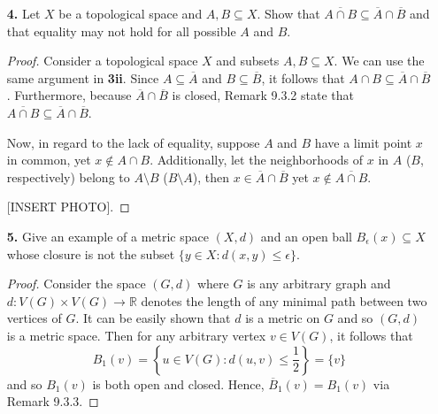 \documentclass[ 12pt ]{article}
\begin{document}
\begin{enumerate}
\begin{proof}
\begin{enumerate}
				\item[\textbf{ii.}] We know that $A \subseteq \overline{A}$ and $B \subseteq \overline{B}$ and so $A \cup B \subseteq \overline{A} \cup \overline{B}$ where $\overline{A}
					\cup \overline{B}$ is closed. Then by Remark 9.3.2, it holds that $\overline{A \cup B} \subseteq \overline{A} \cup \overline{B}$. Conversely, notice that $A, B
					\subseteq A \cup B \subseteq \overline{A \cup B}$. Again by Remark 9.3.2, we have that $\overline{A} \subseteq \overline{A \cup B}$ and $\overline{B} \subseteq
					\overline{A \cup B}$. Hence, $\overline{A} \cup \overline{B} \subseteq \overline{A \cup B}$, proving the assertion.
			\end{enumerate}
		\end{proof}


	\item[\textbf{4.}] Let $X$ be a topological space and $A, B \subseteq X$. Show that $\overline{A \cap B} \subseteq \overline{A} \cap \overline{B}$ and that equality may not hold
		for all possible $A$ and $B$.

		\begin{proof}
			Consider a topological space $X$ and subsets $A, B \subseteq X$. We can use the same argument in \textbf{3ii}. Since $A \subseteq \overline{A}$ and $B \subseteq
			\overline{B}$, it follows that $A \cap B \subseteq \overline{A} \cap \overline{B}$. Furthermore, because $\overline{A} \cap \overline{B}$ is closed, Remark 9.3.2
			state that $\overline{A \cap B} \subseteq \overline{A} \cap \overline{B}$.

			Now, in regard to the lack of equality, suppose $A$ and $B$ have a limit point $x$ in common, yet $x \notin A \cap B$. Additionally, let the neighborhoods of $x$ in $A$
			($B$, respectively) belong to $A \setminus B$ ($B \setminus A$), then $x \in \overline{A} \cap \overline{B}$ yet $x \notin \overline{A \cap B}$.

			[INSERT PHOTO].
		\end{proof}


	\item[\textbf{5.}] Give an example of a metric space $(X, d)$ and an open ball $B_\epsilon(x) \subseteq X$ whose closure is not the subset $\{y \in X : d(x, y) \leq \epsilon\}$.

		\begin{proof}
			Consider the space $(G, d)$ where $G$ is any arbitrary graph and $d : V(G) \times V(G) \to \mathbb{R}$ denotes the length of any minimal path between two vertices of $G$.
			It can be easily shown that $d$ is a metric on $G$ and so $(G, d)$ is a metric space. Then for any arbitrary vertex $v \in V(G)$, it follows that $$B_1(v) = \left \{
			u \in V(G) : d(u, v) \leq \frac{1}{2} \right \} = \{ v \}$$ and so $B_1(v)$ is both open and closed. Hence, $\overline{B}_1(v) = B_1(v)$ via Remark 9.3.3.
		\end{proof}



\end{enumerate}
\end{document}
